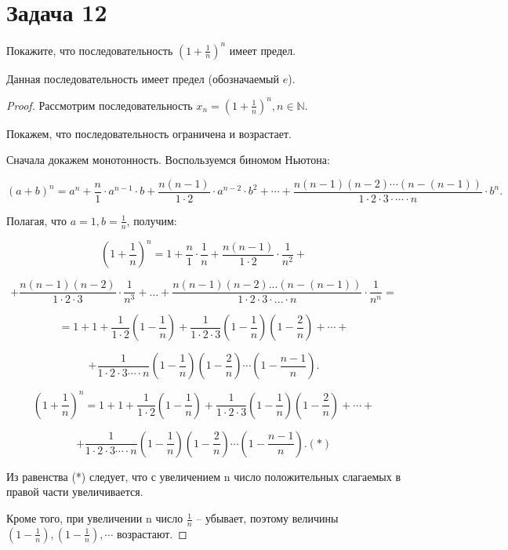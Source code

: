 \section*{Задача 12}

Покажите, что последовательность $(1 + \frac{1}{n})^n$ имеет предел.

\begin{ther}
    Данная последовательность имеет предел (обозначаемый $e$).
\end{ther}

\begin{proof}
        Рассмотрим последовательность $x_n= (1+\frac{1}{n})^n, n \in \mathbb{N}$.

        Покажем, что последовательность ограничена и возрастает.

        Сначала докажем монотонность. Воспользуемся биномом Ньютона:

        $$(a+b)^n= a^{n}+\frac{n}{1}\cdot a^{n-1}\cdot b+\frac{n (n-1)}{1\cdot 2}\cdot a^{n-2}\cdot b^{2}+ \cdots +\frac{n (n-1) (n-2)\cdots (n- (n-1))}{1\cdot 2\cdot 3\cdot \cdots \cdot n}\cdot b^{n}.$$

        Полагая, что  $a= 1, b= \frac{1}{n}$,  получим:

        $$(1+\frac{1}{n})^{n}= 1+\frac{n}{1}\cdot \frac{1}{n}+\frac{n (n-1)}{1\cdot 2}\cdot \frac{1}{n^{2}}+$$

        $$+\frac{n (n-1) (n-2)}{1\cdot 2\cdot 3}\cdot \frac{1}{n^{3}}+ \ldots + \frac{n (n-1) (n-2)... (n- (n-1))}{1\cdot 2\cdot 3\cdot ...\cdot n}\cdot \frac{1}{n^{n}}= $$

        $$= 1+1+\frac{1}{1\cdot 2} (1-\frac{1}{n})+\frac{1}{1\cdot 2\cdot 3} (1-\frac{1}{n}) (1-\frac{2}{n})+\cdots + $$

        $$+\frac{1}{1\cdot 2\cdot 3\cdots \cdot n} (1-\frac{1}{n}) (1-\frac{2}{n})\cdots (1-\frac{n-1}{n}).$$

        $$(1+\frac{1}{n})^{n}= 1+1+\frac{1}{1\cdot 2} (1-\frac{1}{n})+\frac{1}{1\cdot 2\cdot 3} (1-\frac{1}{n}) (1-\frac{2}{n})+ \cdots + $$

        $$+ \frac{1}{1\cdot 2\cdot 3\cdots\cdot n} (1-\frac{1}{n}) (1-\frac{2}{n})\cdots (1-\frac{n-1}{n}). (*)$$

        Из равенства (*) следует, что с увеличением n  число положительных слагаемых в правой части увеличивается.

        Кроме того, при увеличении n число $\frac{1}{n}$ – убывает,
        поэтому величины $(1-\frac{1}{n}), (1-\frac{1}{n}), \cdots$ возрастают.


\end{proof}
